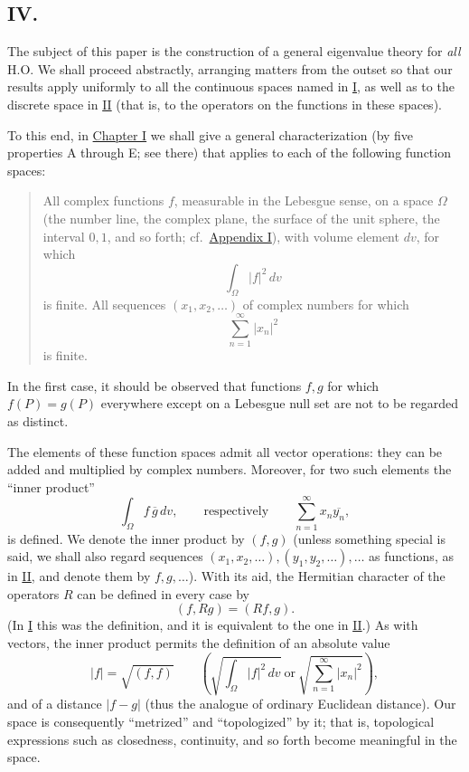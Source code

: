 ﻿\documentclass[paper=b5,fontsize=13pt,bookmarkpackage=false,twoside]{scrartcl}
\begin{document}
\subsection*{IV.}\label{intro:IV}

The subject of this paper is the construction of a general eigenvalue theory for \emph{all} H.O. We shall proceed abstractly, arranging matters from the outset so that our results apply uniformly to all the continuous spaces named in \hyperref[intro:I]{I}, as well as to the discrete space in \hyperref[intro:II]{II} (that is, to the operators on the functions in these spaces).

To this end, in \hyperref[chap:I]{Chapter I} we shall give a general characterization (by five properties A through E; see there) that applies to each of the following function spaces:

\begin{quote}
All complex functions $f$, measurable in the Lebesgue sense, on a space $\Omega$ (the number line, the complex plane, the surface of the unit sphere, the interval $0,1$, and so forth; cf.\ \hyperref[app:I]{Appendix I}), with volume element $dv$, for which
\[
 \int_\Omega|f|^2\,dv
\]
is finite. All sequences $(x_1,x_2,\ldots)$ of complex numbers for which
\[
 \sum_{n=1}^{\infty}|x_n|^2
\]
is finite.
\end{quote}

In the first case, it should be observed that functions $f,g$ for which $f(P)=g(P)$ everywhere except on a Lebesgue null set are not to be regarded as distinct.

The elements of these function spaces admit all vector operations: they can be added and multiplied by complex numbers. Moreover, for two such elements the ``inner product''
\[
 \int_\Omega f\,\overline g\,dv,
 \qquad\text{respectively}\qquad
 \sum_{n=1}^{\infty}x_n\overline{y_n},
\]
is defined. We denote the inner product by $(f,g)$ (unless something special is said, we shall also regard sequences $(x_1,x_2,\ldots),(y_1,y_2,\ldots),\ldots$ as functions, as in \hyperref[intro:II]{II}, and denote them by $f,g,\ldots$). With its aid, the Hermitian character of the operators $R$ can be defined in every case by
\[
 (f,Rg)=(Rf,g).
\]
(In \hyperref[intro:I]{I} this was the definition, and it is equivalent to the one in \hyperref[intro:II]{II}.) As with vectors, the inner product permits the definition of an absolute value
\[
 |f|=\sqrt{(f,f)}
 \qquad
 \left(
 \sqrt{\int_\Omega|f|^2\,dv}
 \ \text{or}\
 \sqrt{\sum_{n=1}^{\infty}|x_n|^2}
 \right),
\]
and of a distance $|f-g|$ (thus the analogue of ordinary Euclidean distance). Our space is consequently ``metrized'' and ``topologized'' by it; that is, topological expressions such as closedness, continuity, and so forth become meaningful in the space.
\end{document}
